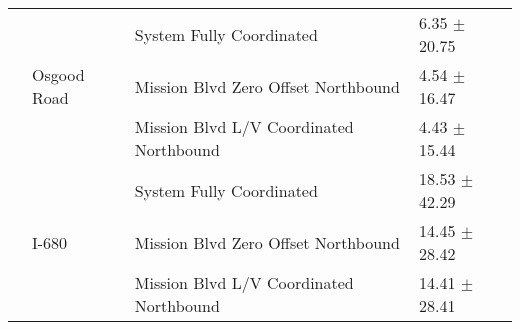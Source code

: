 \begin{tabular}{llll}
 & \multirow[t]{3}{*}{Osgood Road} & System Fully Coordinated & 6.35 $\pm$ 20.75 \\
 &  & Mission Blvd Zero Offset Northbound & 4.54 $\pm$ 16.47 \\
 &  & Mission Blvd L/V Coordinated Northbound & 4.43 $\pm$ 15.44 \\
 & \multirow[t]{3}{*}{I-680} & System Fully Coordinated & 18.53 $\pm$ 42.29 \\
 &  & Mission Blvd Zero Offset Northbound & 14.45 $\pm$ 28.42 \\
 &  & Mission Blvd L/V Coordinated Northbound & 14.41 $\pm$ 28.41 \\
\bottomrule
\end{tabular}
